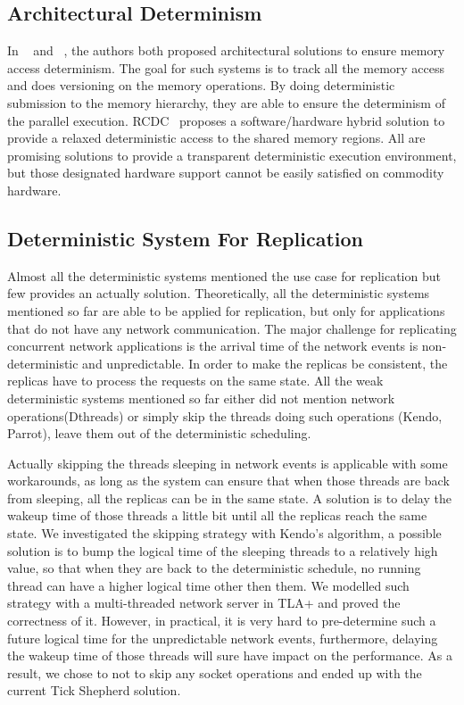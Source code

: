 \subsection{Architectural Determinism}
In ~\cite{segulja2012architectural} and ~\cite{hower2011calvin}, the authors both proposed architectural solutions to ensure memory access determinism. The goal for such systems is to track all the memory access and does versioning on the memory operations. By doing deterministic submission to the memory hierarchy, they are able to ensure the determinism of the parallel execution. RCDC~\cite{devietti2011rcdc} proposes a software/hardware hybrid solution to provide a relaxed deterministic access to the shared memory regions. All are promising solutions to provide a transparent deterministic execution environment, but those designated hardware support cannot be easily satisfied on commodity hardware. 

\subsection{Deterministic System For Replication}
Almost all the deterministic systems mentioned the use case for replication but few provides an actually solution. Theoretically, all the deterministic systems mentioned so far are able to be applied for replication, but only for applications that do not have any network communication. The major challenge for replicating concurrent network applications is the arrival time of the network events is non-deterministic and unpredictable. In order to make the replicas be consistent, the replicas have to process the requests on the same state. All the weak deterministic systems mentioned so far either did not mention network operations(Dthreads\cite{liu2011dthreads}) or simply skip the threads doing such operations (Kendo\cite{olszewski2009kendo}, Parrot\cite{cui2013parrot}), leave them out of the deterministic scheduling.

Actually skipping the threads sleeping in network events is applicable with some workarounds, as long as the system can ensure that when those threads are back from sleeping, all the replicas can be in the same state. A solution is to delay the wakeup time of those threads a little bit until all the replicas reach the same state. We investigated the skipping strategy with Kendo's algorithm, a possible solution is to bump the logical time of the sleeping threads to a relatively high value, so that when they are back to the deterministic schedule, no running thread can have a higher logical time other then them. We modelled such strategy with a multi-threaded network server in TLA+ and proved the correctness of it. However, in practical, it is very hard to pre-determine such a future logical time for the unpredictable network events, furthermore, delaying the wakeup time of those threads will sure have impact on the performance. As a result, we chose to not to skip any socket operations and ended up with the current Tick Shepherd solution.

